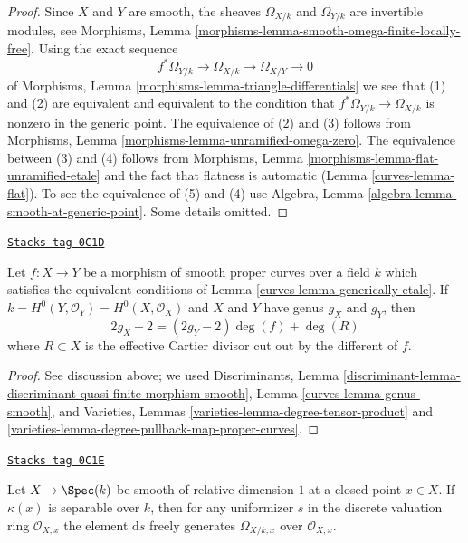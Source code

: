 \begin{proof}

Since $X$ and $Y$ are smooth, the sheaves $\Omega_{X/k}$ and
$\Omega_{Y/k}$ are invertible modules, see
Morphisms, Lemma \ref{morphisms-lemma-smooth-omega-finite-locally-free}.
Using the exact sequence
$$
f^*\Omega_{Y/k} \longrightarrow \Omega_{X/k}
\longrightarrow \Omega_{X/Y} \longrightarrow 0
$$
of Morphisms, Lemma \ref{morphisms-lemma-triangle-differentials}
we see that (1) and (2) are equivalent and equivalent to the
condition that $f^*\Omega_{Y/k} \to \Omega_{X/k}$ is nonzero
in the generic point. The equivalence of (2) and (3) follows
from Morphisms, Lemma \ref{morphisms-lemma-unramified-omega-zero}.
The equivalence between (3) and (4) follows from
Morphisms, Lemma \ref{morphisms-lemma-flat-unramified-etale}
and the fact that flatness is automatic
(Lemma \ref{curves-lemma-flat}).
To see the equivalence of (5) and (4)
use Algebra, Lemma \ref{algebra-lemma-smooth-at-generic-point}.
Some details omitted.
\end{proof}

\begin{lemma}[Rh]
\label{curves-lemma-rh}
\href{https://stacks.math.columbia.edu/tag/0C1D}{\texttt{Stacks tag 0C1D}}

Let $f : X \to Y$ be a morphism of smooth proper curves
over a field $k$ which satisfies the equivalent conditions of
Lemma \ref{curves-lemma-generically-etale}. If
$k = H^0(Y, \mathcal{O}_Y) = H^0(X, \mathcal{O}_X)$
and $X$ and $Y$ have genus $g_X$ and $g_Y$, then
$$
2g_X - 2 = (2g_Y - 2) \deg(f) + \deg(R)
$$
where $R \subset X$ is the effective Cartier divisor cut out by
the different of $f$.
\end{lemma}

\begin{proof}

See discussion above; we used
Discriminants, Lemma
\ref{discriminant-lemma-discriminant-quasi-finite-morphism-smooth},
Lemma \ref{curves-lemma-genus-smooth}, and
Varieties, Lemmas \ref{varieties-lemma-degree-tensor-product} and
\ref{varieties-lemma-degree-pullback-map-proper-curves}.
\end{proof}

\begin{lemma}
\label{curves-lemma-uniformizer-works}
\href{https://stacks.math.columbia.edu/tag/0C1E}{\texttt{Stacks tag 0C1E}}

Let $X \to \Spec(k)$ be smooth of relative dimension $1$ at a closed
point $x \in X$. If $\kappa(x)$ is separable over $k$, then for
any uniformizer $s$ in the discrete valuation ring $\mathcal{O}_{X, x}$
the element $\text{d}s$ freely generates $\Omega_{X/k, x}$
over $\mathcal{O}_{X, x}$.
\end{lemma}

